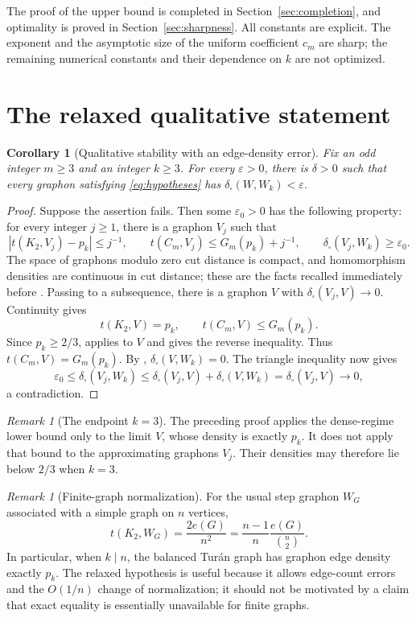 \documentclass[11pt]{article}
\newtheorem{corollary}[lemma]{Corollary}
\theoremstyle{remark}
\newtheorem{remark}[lemma]{Remark}
\newcommand{\dsq}{\delta_{\square}}
\newcommand{\abs}[1]{\left\lvert #1\right\rvert}
\begin{document}
The proof of the upper bound is completed in Section~\ref{sec:completion},
and optimality is proved in Section~\ref{sec:sharpness}.
All constants are explicit. The exponent and the asymptotic size of the
uniform coefficient $c_m$ are sharp; the remaining numerical constants
and their dependence on $k$ are not optimized.

\section{The relaxed qualitative statement}

\begin{corollary}[Qualitative stability with an edge-density error]
\label{cor:qualitative}
Fix an odd integer $m\geq3$ and an integer $k\geq3$.
For every $\varepsilon>0$, there is $\delta>0$ such that every graphon
satisfying \eqref{eq:hypotheses} has $\dsq(W,W_k)<\varepsilon$.
\end{corollary}

\begin{proof}
Suppose the assertion fails. Then some $\varepsilon_0>0$ has the
following property: for every integer $j\geq1$, there is a graphon
$V_j$ such that
\[
 \abs{t(K_2,V_j)-p_k}\leq j^{-1},\qquad
 t(C_m,V_j)\leq G_m(p_k)+j^{-1},\qquad
 \dsq(V_j,W_k)\geq\varepsilon_0.
\]
The space of graphons modulo zero cut distance is compact, and
homomorphism densities are continuous in cut distance; these are the
facts recalled immediately before \cite[Corollary~6.3]{dense}.
Passing to a subsequence, there is a graphon $V$ with
$\dsq(V_j,V)\to0$. Continuity gives
\[
 t(K_2,V)=p_k,\qquad t(C_m,V)\leq G_m(p_k).
\]
Since $p_k\geq2/3$, \cite[Theorem~1.1]{dense} applies to $V$ and gives
the reverse inequality. Thus $t(C_m,V)=G_m(p_k)$.
By \cite[Proposition~6.2]{dense}, $\dsq(V,W_k)=0$.
The triangle inequality now gives
\[
 \varepsilon_0\leq\dsq(V_j,W_k)
 \leq\dsq(V_j,V)+\dsq(V,W_k)
 =\dsq(V_j,V)\longrightarrow0,
\]
a contradiction.
\end{proof}

\begin{remark}[The endpoint $k=3$]
The preceding proof applies the dense-regime lower bound only to the
limit $V$, whose density is exactly $p_k$. It does not apply that bound
to the approximating graphons $V_j$. Their densities may therefore lie
below $2/3$ when $k=3$.
\end{remark}

\begin{remark}[Finite-graph normalization]
For the usual step graphon $W_G$ associated with a simple graph on $n$
vertices,
\[
 t(K_2,W_G)=\frac{2e(G)}{n^2}
 =\frac{n-1}{n}\frac{e(G)}{\binom n2}.
\]
In particular, when $k\mid n$, the balanced Tur\'an graph has graphon
edge density exactly $p_k$. The relaxed hypothesis is useful because it
allows edge-count errors and the $O(1/n)$ change of normalization; it
should not be motivated by a claim that exact equality is essentially
unavailable for finite graphs.
\end{remark}
\end{document}
